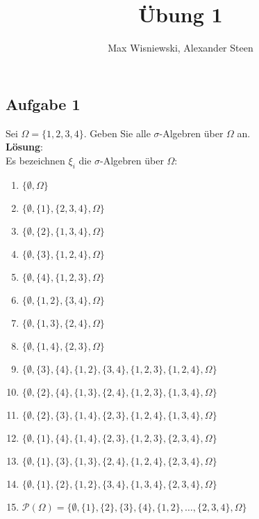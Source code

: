 \documentclass[11pt,a4paper,ngerman]{article}
\date{}
\title{Übung 1}
\author{Max Wisniewski, Alexander Steen}
\newcommand{\set}[1]{ \{ #1 \}}
\begin{document}

\renewcommand{\figurename}{Figure}

\maketitle
\thispagestyle{fancy}


\subsection*{Aufgabe 1}
Sei $\Omega = \{1,2,3,4\}$. Geben Sie alle $\sigma$-Algebren über $\Omega$ an. \\

\textbf{Lösung}: \\
Es bezeichnen $\xi_i$ die $\sigma$-Algebren über $\Omega$:
\begin{enumerate}[$\xi_1 = $]
\item $\{\emptyset, \Omega \}$
\item $\set{\emptyset, \set{1}, \set{2,3,4}, \Omega}$
\item $\set{\emptyset, \set{2}, \set{1,3,4},\Omega}$
\item $\set{\emptyset, \set{3}, \set{1,2,4},\Omega}$
\item $\set{\emptyset, \set{4}, \set{1,2,3},\Omega}$
\item $\{\emptyset, \set{1,2}, \set{3,4}, \Omega \}$
\item $\{\emptyset, \set{1,3}, \set{2,4}, \Omega \}$
\item $\{\emptyset, \set{1,4}, \set{2,3}, \Omega \}$
\item $\{\emptyset, \set{3}, \set{4}, \set{1,2}, \set{3,4}, \set{1,2,3}, \set{1,2,4}, \Omega \}$
\item $\{\emptyset, \set{2}, \set{4}, \set{1,3}, \set{2,4}, \set{1,2,3}, \set{1,3,4}, \Omega \}$
\item $\{\emptyset, \set{2}, \set{3}, \set{1,4}, \set{2,3}, \set{1,2,4}, \set{1,3,4}, \Omega \}$
\item $\{\emptyset, \set{1}, \set{4}, \set{1,4}, \set{2,3}, \set{1,2,3}, \set{2,3,4}, \Omega \}$
\item $\{\emptyset, \set{1}, \set{3}, \set{1,3}, \set{2,4}, \set{1,2,4}, \set{2,3,4}, \Omega \}$
\item $\{\emptyset, \set{1}, \set{2}, \set{1,2}, \set{3,4}, \set{1,3,4}, \set{2,3,4}, \Omega \}$
\item $\mathcal{P}(\Omega) = \{\emptyset, \set{1},\set{2},\set{3}, \set{4}, \set{1,2}, \ldots, \set{2,3,4}, \Omega \}$
\end{enumerate}
\end{document}
